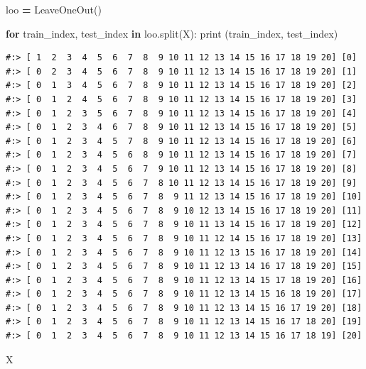 \documentclass[
]{book}
\newenvironment{Shaded}{\begin{snugshade}}{\end{snugshade}}
\newcommand{\BuiltInTok}[1]{#1}
\newcommand{\ControlFlowTok}[1]{\textcolor[rgb]{0.27,0.27,0.27}{\textbf{#1}}}
\newcommand{\KeywordTok}[1]{\textcolor[rgb]{0.27,0.27,0.27}{\textbf{#1}}}
\newcommand{\NormalTok}[1]{#1}
\newcommand{\OperatorTok}[1]{\textcolor[rgb]{0.43,0.43,0.43}{\textbf{#1}}}
\begin{document}
\begin{Shaded}
\begin{Highlighting}[]
\NormalTok{loo }\OperatorTok{=}\NormalTok{ LeaveOneOut()}
\end{Highlighting}
\end{Shaded}

\begin{Shaded}
\begin{Highlighting}[]
\ControlFlowTok{for}\NormalTok{ train_index, test_index }\KeywordTok{in}\NormalTok{ loo.split(X):}
  \BuiltInTok{print}\NormalTok{ (train_index, test_index)}
\end{Highlighting}
\end{Shaded}

\begin{verbatim}
#:> [ 1  2  3  4  5  6  7  8  9 10 11 12 13 14 15 16 17 18 19 20] [0]
#:> [ 0  2  3  4  5  6  7  8  9 10 11 12 13 14 15 16 17 18 19 20] [1]
#:> [ 0  1  3  4  5  6  7  8  9 10 11 12 13 14 15 16 17 18 19 20] [2]
#:> [ 0  1  2  4  5  6  7  8  9 10 11 12 13 14 15 16 17 18 19 20] [3]
#:> [ 0  1  2  3  5  6  7  8  9 10 11 12 13 14 15 16 17 18 19 20] [4]
#:> [ 0  1  2  3  4  6  7  8  9 10 11 12 13 14 15 16 17 18 19 20] [5]
#:> [ 0  1  2  3  4  5  7  8  9 10 11 12 13 14 15 16 17 18 19 20] [6]
#:> [ 0  1  2  3  4  5  6  8  9 10 11 12 13 14 15 16 17 18 19 20] [7]
#:> [ 0  1  2  3  4  5  6  7  9 10 11 12 13 14 15 16 17 18 19 20] [8]
#:> [ 0  1  2  3  4  5  6  7  8 10 11 12 13 14 15 16 17 18 19 20] [9]
#:> [ 0  1  2  3  4  5  6  7  8  9 11 12 13 14 15 16 17 18 19 20] [10]
#:> [ 0  1  2  3  4  5  6  7  8  9 10 12 13 14 15 16 17 18 19 20] [11]
#:> [ 0  1  2  3  4  5  6  7  8  9 10 11 13 14 15 16 17 18 19 20] [12]
#:> [ 0  1  2  3  4  5  6  7  8  9 10 11 12 14 15 16 17 18 19 20] [13]
#:> [ 0  1  2  3  4  5  6  7  8  9 10 11 12 13 15 16 17 18 19 20] [14]
#:> [ 0  1  2  3  4  5  6  7  8  9 10 11 12 13 14 16 17 18 19 20] [15]
#:> [ 0  1  2  3  4  5  6  7  8  9 10 11 12 13 14 15 17 18 19 20] [16]
#:> [ 0  1  2  3  4  5  6  7  8  9 10 11 12 13 14 15 16 18 19 20] [17]
#:> [ 0  1  2  3  4  5  6  7  8  9 10 11 12 13 14 15 16 17 19 20] [18]
#:> [ 0  1  2  3  4  5  6  7  8  9 10 11 12 13 14 15 16 17 18 20] [19]
#:> [ 0  1  2  3  4  5  6  7  8  9 10 11 12 13 14 15 16 17 18 19] [20]
\end{verbatim}

\begin{Shaded}
\begin{Highlighting}[]
\NormalTok{X}
\end{Highlighting}
\end{Shaded}
\end{document}
